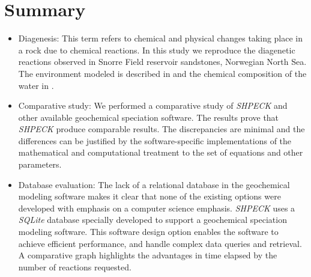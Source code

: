 \section{Summary}
\begin{itemize}
    \item Diagenesis: This term refers to chemical and physical changes taking place in a rock due to chemical reactions. In this study we reproduce the diagenetic reactions observed in Snorre Field reservoir sandstones, Norwegian North Sea. 
    The environment modeled is described in \cite{Morad:90} and the chemical composition of the water in \cite{Nordstrom:79}.
    \item Comparative study: We performed a comparative study of \emph{SHPECK} and other available geochemical speciation software. The results prove that \emph{SHPECK} produce comparable results. The discrepancies are minimal and the differences can be justified by the software-specific implementations of the mathematical and computational treatment to the set of equations and other parameters. 
    \item Database evaluation: The lack of a relational database in the geochemical modeling software makes it clear that none of the existing options were developed with emphasis on a computer science emphasis. \emph{SHPECK} uses a \emph{SQLite} database specially developed to support a geochemical speciation modeling software. This software design option enables the software to achieve efficient performance, and handle complex data queries and retrieval. A comparative graph highlights the advantages in time elapsed by the number of reactions requested.
\end{itemize}